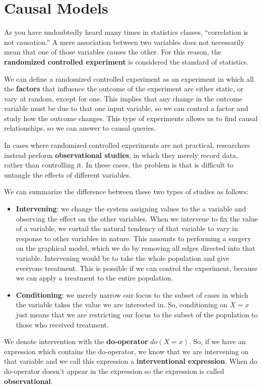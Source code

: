 \chapter{Causal Models}
As you have undoubtedly heard many times in statistics classes, “correlation is
not causation.” A mere association between two variables does not necessarily
mean that one of those variables causes the other. For this reason, the
\textbf{randomized controlled experiment} is considered the standard of statistics.

We can define a randomized controlled experiment as an experiment in which all
the \textbf{factors} that influence the outcome of the experiment are either
static, or vary at random, except for one. This implies that any change in the
outcome variable must be due to that one input variable, so we can control a factor
and study how the outcome changes. This type of experiments allows us to find causal 
relationships, so we can answer to causal queries.

In cases where randomized controlled experiments are not practical, researchers
instead perform \textbf{observational studies}, in which they merely record data,
rather than controlling it. In these cases, the problem is that is difficult to
untangle the effects of different variables.

We can summarize the difference between these two types of studies as follows:
\begin{itemize}
      \item \textbf{Intervening}: we change the system assigning values to the a
            variable and observing the effect on the other variables. When we
            intervene to fix the value of a variable, we curtail the natural
            tendency of that variable to vary in response to other variables in
            nature. This amounts to performing a surgery on the graphical model,
            which we do by removing all edges directed into that variable.
            Intervening would be to take the whole population and give everyone
            treatment. This is possible if we can control the experiment, because 
            we can apply a treatment to the entire population.
      \item \textbf{Conditioning}: we merely narrow our focus to the subset of
            cases in which the variable takes the value we are interested in.
            So, conditioning on $X = x$ just means that we are restricting our
            focus to the subset of the population to those who received treatment.
\end{itemize}
We denote intervention with the \textbf{do-operator} $do(X=x)$. So, if we have
an expression which contains the do-operator, we know that we are intervening
on that variable and we call this expression a \textbf{interventional expression}.
When do do-operator doesn't appear in the expression so the expression is called 
\textbf{observational}.


